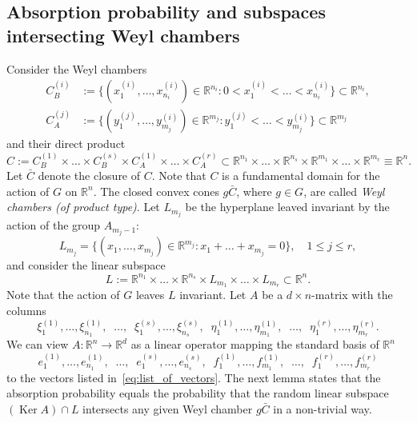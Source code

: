 \documentclass[12pt, reqno]{amsart}
\theoremstyle{plain}
\theoremstyle{definition}
\theoremstyle{remark}
\begin{document}
\subsection{Absorption probability and subspaces intersecting Weyl chambers}
Consider the Weyl chambers
\begin{align*}
C_B^{(i)} &:= \{(x_1^{(i)}, \ldots, x_{n_i}^{(i)})\in {\mathbb{R}}^{n_i} \colon 0< x_1^{(i)}< \ldots < x_{n_i}^{(i)}\} \subset {\mathbb{R}}^{n_i},\\
C_A^{(j)} &:= \{(y_1^{(j)}, \ldots, y_{m_j}^{(i)})\in {\mathbb{R}}^{m_j} \colon y_1^{(j)}< \ldots < y_{m_j}^{(i)}\} \subset {\mathbb{R}}^{m_j}
\end{align*}
and their direct product
$$
C:= C_B^{(1)}\times \ldots \times C_B^{(s)}\times C_A^{(1)}\times \ldots \times C_A^{(r)} \subset {\mathbb{R}}^{n_1}\times \ldots \times {\mathbb{R}}^{n_s}\times {\mathbb{R}}^{m_1}\times \ldots \times {\mathbb{R}}^{m_r}\equiv {\mathbb{R}}^n.
$$
Let $\bar C$ denote the closure of $C$.
Note that $C$ is a fundamental domain for the action of $G$ on ${\mathbb{R}}^n$. The closed convex cones $g \bar C$, where $g\in G$, are called \emph{Weyl chambers (of product type)}.
Let $L_{m_j}$ be the hyperplane leaved invariant by the action of the group $A_{m_j-1}$:
\begin{equation}\label{eq:L_m_j_def}
L_{m_j}= \{(x_1,\ldots,x_{m_j})\in {\mathbb{R}}^{m_j}\colon x_1+\ldots+x_{m_j} = 0\}, \quad 1\leq j\leq r,
\end{equation}
and consider the linear subspace
$$
L:= {\mathbb{R}}^{n_1}\times \ldots \times {\mathbb{R}}^{n_s}\times L_{m_1}\times \ldots \times L_{m_r} \subset {\mathbb{R}}^n.
$$
Note that the action of $G$ leaves $L$ invariant. Let $A$ be a $d\times n$-matrix with the columns
\begin{equation}\label{eq:list_of_vectors}
\xi_1^{(1)},\ldots,\xi_{n_1}^{(1)},\;\; \ldots,\;\; \xi_1^{(s)},\ldots,\xi_{n_s}^{(s)},\;\;
\eta_1^{(1)}, \ldots, \eta_{m_1}^{(1)},\;\; \ldots,\;\; \eta_1^{(r)}, \ldots, \eta_{m_r}^{(r)}.
\end{equation}
We can view $A: {\mathbb{R}}^n \to {\mathbb{R}}^d$ as a linear operator mapping the standard basis of ${\mathbb{R}}^n$
\begin{equation}\label{eq:standard_basis}
e_1^{(1)},\ldots,e_{n_1}^{(1)},\;\;\ldots,\;\; e_1^{(s)},\ldots,e_{n_s}^{(s)},\;\;
f_1^{(1)}, \ldots, f_{m_1}^{(1)},\;\; \ldots,\;\; f_1^{(r)}, \ldots, f_{m_r}^{(r)}
\end{equation}
to the vectors listed in~\eqref{eq:list_of_vectors}. The next lemma states that the absorption probability equals  the probability that the random linear subspace $(\operatorname*{Ker} A)\cap L$ intersects any given Weyl chamber $g \bar C$ in a non-trivial way.
\end{document}
